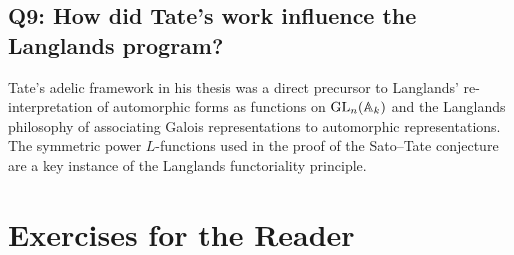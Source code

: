 \subsection*{Q9: How did Tate's work influence the Langlands program?}

Tate's adelic framework in his thesis was a direct precursor to Langlands' re-interpretation of automorphic forms as functions on \(\operatorname{GL}_n(\mathbb{A}_k)\) and the Langlands philosophy of associating Galois representations to automorphic representations. The symmetric power \(L\)-functions used in the proof of the Sato--Tate conjecture are a key instance of the Langlands functoriality principle.

\section*{Exercises for the Reader}

